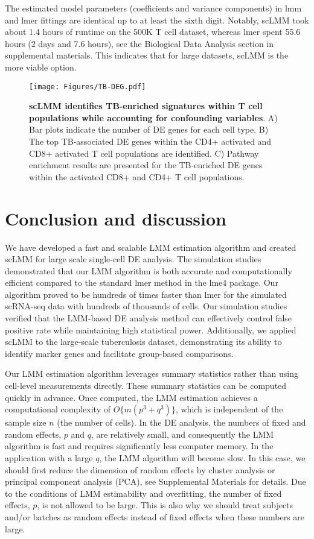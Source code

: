 \documentclass[
]{article}
\begin{document}
The estimated model parameters (coefficients and variance components) in
lmm and lmer fittings are identical up to at least the sixth digit.
Notably, scLMM took about 1.4 hours of runtime on the 500K T cell
dataset, whereas lmer spent 55.6 hours (2 days and 7.6 hours), see the
Biological Data Analysis section in supplemental materials. This
indicates that for large datasets, scLMM is the more viable option.

\begin{figure}
\centering
\texttt{[image: Figures/TB-DEG.pdf]}
\caption{\textbf{scLMM identifies TB-enriched signatures within T cell
populations while accounting for confounding variables}. A) Bar plots
indicate the number of DE genes for each cell type. B) The top
TB-associated DE genes within the CD4+ activated and CD8+ activated T
cell populations are identified. C) Pathway enrichment results are
presented for the TB-enriched DE genes within the activated CD8+ and
CD4+ T cell populations.\label{fig:TBdeg}}
\end{figure}

\hypertarget{conclusion-and-discussion}{%
\section{Conclusion and discussion}\label{conclusion-and-discussion}}

We have developed a fast and scalable LMM estimation algorithm and
created scLMM for large scale single-cell DE analysis. The simulation
studies demonstrated that our LMM algorithm is both accurate and
computationally efficient compared to the standard lmer method in the
lme4 package. Our algorithm proved to be hundreds of times faster than
lmer for the simulated scRNA-seq data with hundreds of thousands of
cells. Our simulation studies verified that the LMM-based DE analysis
method can effectively control false positive rate while maintaining
high statistical power. Additionally, we applied scLMM to the
large-scale tuberculosis dataset, demonstrating its ability to identify
marker genes and facilitate group-based comparisons.

Our LMM estimation algorithm leverages summary statistics rather than
using cell-level measurements directly. These summary statistics can be
computed quickly in advance. Once computed, the LMM estimation achieves
a computational complexity of \(O\{m(p^3 +q^3)\}\), which is independent
of the sample size \(n\) (the number of cells). In the DE analysis, the
numbers of fixed and random effects, \(p\) and \(q\), are relatively
small, and consequently the LMM algorithm is fast and requires
significantly less computer memory. In the application with a large
\(q\), the LMM algorithm will become slow. In this case, we should first
reduce the dimension of random effects by cluster analysis or principal
component analysis (PCA), see Supplemental Materials for details. Due to
the conditions of LMM estimability and overfitting, the number of fixed
effects, \(p\), is not allowed to be large. This is also why we should
treat subjects and/or batches as random effects instead of fixed effects
when these numbers are large.
\end{document}
